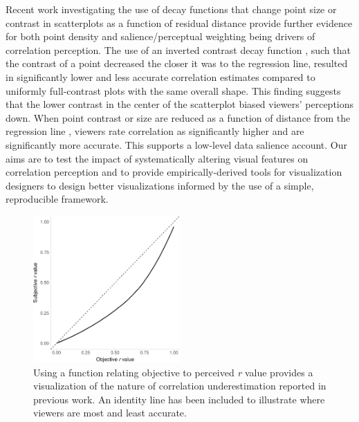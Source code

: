 \documentclass[manuscript, review, anonymous, screen]{acmart}
\begin{document}
Recent work investigating the use of decay functions that change point
size or contrast in scatterplots as a function of residual distance
provide further evidence for both point density and salience/perceptual
weighting being drivers of correlation perception. The use of an
inverted contrast decay function \citep{strain_2023}, such that the
contrast of a point decreased the closer it was to the regression line,
resulted in significantly lower and less accurate correlation estimates
compared to uniformly full-contrast plots with the same overall shape.
This finding suggests that the lower contrast in the center of the
scatterplot biased viewers' perceptions down. When point contrast or
size are reduced as a function of distance from the regression line
\citep{strain_2023, strain_2023b}, viewers rate correlation as
significantly higher and are significantly more accurate. This supports
a low-level data salience account. Our aims are to test the impact of
systematically altering visual features on correlation perception and to
provide empirically-derived tools for visualization designers to design
better visualizations informed by the use of a simple, reproducible
framework.

\begin{figure}

\includegraphics[width=0.5\textwidth,height=\textheight]{size_and_contrast_files/figure-pdf/fig-underestimation-curve-1.pdf} \hfill{}

\caption{\label{fig-underestimation-curve}Using a function relating
objective to perceived \emph{r} value \citep{rensink_2017} provides a
visualization of the nature of correlation underestimation reported in
previous work. An identity line has been included to illustrate where
viewers are most and least accurate.}
\end{figure}
\end{document}
